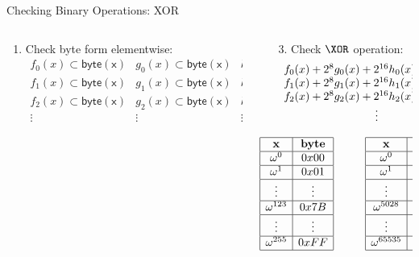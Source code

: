 \begin{frame}{Checking Binary Operations: XOR}
\begin{columns}
\begin{column}{0.5\textwidth}
\begin{enumerate}
\item Check byte form elementwise:
\[
\begin{array}{ccc}
f_0(x) \subset \mathsf{byte(x)} & g_0(x) \subset \mathsf{byte(x)} & h_0(x) \subset \mathsf{byte(x)} \\
f_1(x) \subset \mathsf{byte(x)} & g_1(x) \subset \mathsf{byte(x)} & h_1(x) \subset \mathsf{byte(x)} \\
f_2(x) \subset \mathsf{byte(x)} & g_2(x) \subset \mathsf{byte(x)} & h_2(x) \subset \mathsf{byte(x)} \\
\vdots & \vdots & \vdots
\end{array}
\]
\end{enumerate}
\end{column}
\begin{column}{0.5\textwidth}
\begin{enumerate}
\item[3.] Check $\XOR$ operation:
\[
\begin{array}{c}
f_0(x) + 2^8 g_0(x) + 2^{16} h_0(x) \subset \XOR(x) \\
f_1(x) + 2^8 g_1(x) + 2^{16} h_1(x) \subset \XOR(x) \\
f_2(x) + 2^8 g_2(x) + 2^{16} h_2(x) \subset \XOR(x) \\
\vdots
\end{array}
\]
\end{enumerate}
\[
\begin{array}{|c|c|}
\hline
\mathbf{x} & \mathbf{byte} \\ \hline
\omega^0 & 0x00 \\ \hline
\omega^1 & 0x01 \\ \hline
\vdots & \vdots \\ \hline
\omega^{123} & 0x7B \\ \hline
\vdots & \vdots \\ \hline
\omega^{255} & 0xFF \\ \hline
\end{array}
\hspace{1cm}
\begin{array}{|c|c|}
\hline
\mathbf{x} & \XOR \\ \hline
\omega^0 & 0x000000 \\ \hline
\omega^1 & 0x010001 \\ \hline
\vdots & \vdots \\ \hline
\omega^{5028} & 0xB713A4 \\ \hline
\vdots & \vdots \\ \hline
\omega^{65535} & 0x00FFFF \\ \hline
\end{array}
\]
\end{column}
\end{columns}
\end{frame}










